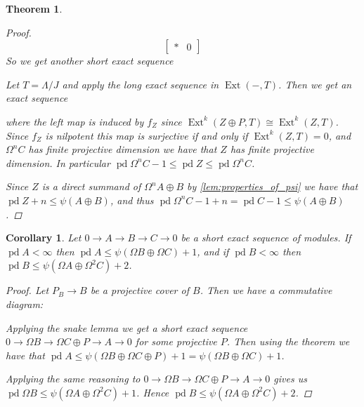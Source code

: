 \documentclass[11pt, a4paper, english]{article}
\newtheorem{theorem}{Theorem}[section]
\newtheorem{cor}{Corollary}[theorem]
\theoremstyle{definition}
\DeclareMathOperator{\Ext}{Ext}
\DeclareMathOperator{\pd}{pd}
\begin{document}
\begin{theorem}
\begin{proof}
$$\begin{bmatrix}
		* & 0
		\end{bmatrix} $$
		So we get another short exact sequence
		\begin{center}
		\end{center}
		Let $T = \Lambda/J$ and apply the long exact sequence in $\Ext(-, T)$. Then we get an exact sequence
		\begin{center}
		\end{center}
		where the left map is induced by $f_Z$ since $\Ext^k(Z \oplus P, T) \cong \Ext^k(Z, T)$. Since $f_Z$ is nilpotent this map is surjective if and only if $\Ext^k(Z, T)=0$, and $\Omega^nC$ has finite projective dimension we have that $Z$ has finite projective dimension. In particular $\pd\Omega^n C -1 \leq \pd Z \leq \pd\Omega^n C$.
		
		Since $Z$ is a direct summand of $\Omega^n A\oplus B$ by \cref{lem:properties_of_psi} we have that $\pd Z + n \leq \psi(A \oplus B)$, and thus $\pd \Omega^n C - 1 + n = \pd C - 1 \leq \psi(A \oplus B)$.
	\end{proof}
\end{theorem}

\begin{cor}\label{cor:projdim_bounded_by_psi}
	Let $0 \to A \to B \to C \to 0$ be a short exact sequence of modules. If $\pd A < \infty$ then $\pd A \leq \psi(\Omega B \oplus \Omega C)+1$, and if $\pd B < \infty$ then $\pd B \leq \psi(\Omega A \oplus \Omega^2 C) + 2$.
	\begin{proof}
		Let $P_B \to B$ be a projective cover of $B$. Then we have a commutative diagram:
		\begin{center}
		\end{center}
		Applying the snake lemma we get a short exact sequence $0 \to \Omega B \to \Omega C \oplus P \to A \to 0$ for some projective $P$. Then using the theorem we have that $\pd A \leq \psi(\Omega B \oplus \Omega C \oplus P) + 1 = \psi(\Omega B \oplus \Omega C) + 1$.
		
		Applying the same reasoning to $0 \to \Omega B \to \Omega C \oplus P \to A \to 0$ gives us $\pd\Omega B \leq \psi(\Omega A \oplus \Omega^2 C) + 1$. Hence $\pd B \leq  \psi(\Omega A \oplus \Omega^2 C) + 2$.
	\end{proof}
\end{cor}
\end{document}
